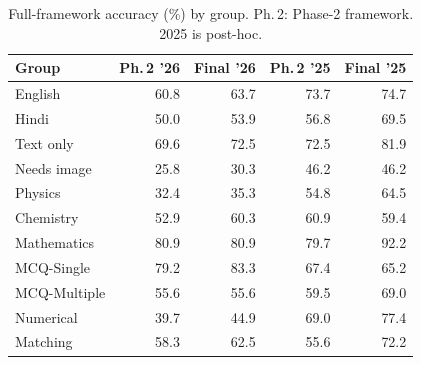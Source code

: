 \begin{table}[!t]
\centering
\footnotesize
\caption{Full-framework accuracy (\%) by group. Ph.\,2: Phase-2 framework. 2025 is post-hoc.}
\label{tab:bd}
\setlength{\tabcolsep}{3.5pt}
\begin{tabular}{lrrrr}
\toprule
Group & Ph.\,2 '26 & Final '26 & Ph.\,2 '25 & Final '25 \\
\midrule
English & 60.8 & 63.7 & 73.7 & 74.7 \\
Hindi & 50.0 & 53.9 & 56.8 & 69.5 \\
Text only & 69.6 & 72.5 & 72.5 & 81.9 \\
Needs image & 25.8 & 30.3 & 46.2 & 46.2 \\
Physics & 32.4 & 35.3 & 54.8 & 64.5 \\
Chemistry & 52.9 & 60.3 & 60.9 & 59.4 \\
Mathematics & 80.9 & 80.9 & 79.7 & 92.2 \\
MCQ-Single & 79.2 & 83.3 & 67.4 & 65.2 \\
MCQ-Multiple & 55.6 & 55.6 & 59.5 & 69.0 \\
Numerical & 39.7 & 44.9 & 69.0 & 77.4 \\
Matching & 58.3 & 62.5 & 55.6 & 72.2 \\
\bottomrule
\end{tabular}
\end{table}

